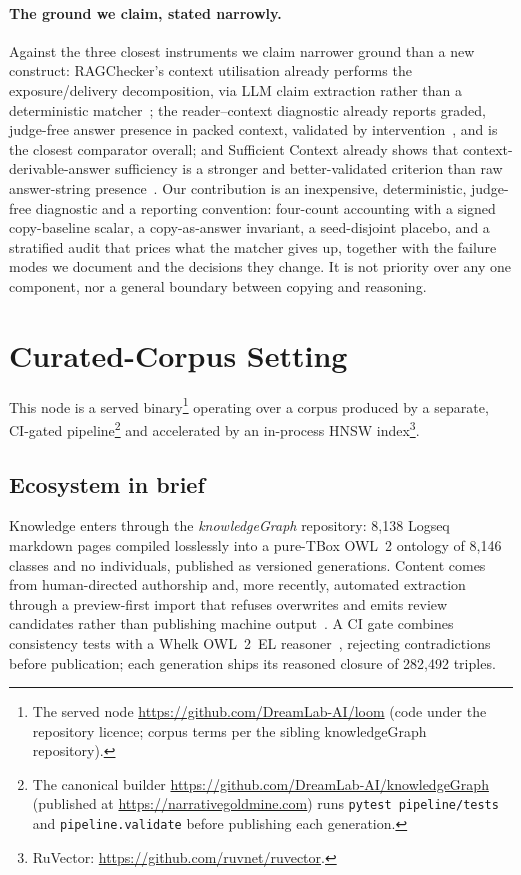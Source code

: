 \documentclass[10pt,twocolumn]{article}
\begin{document}
\paragraph{The ground we claim, stated narrowly.}
Against the three closest instruments we claim narrower ground than a new construct: RAGChecker's context utilisation already performs the exposure/delivery decomposition, via LLM claim extraction rather than a deterministic matcher~\cite{ragchecker2024}; the reader--context diagnostic already reports graded, judge-free answer presence in packed context, validated by intervention~\cite{readercontext2026}, and is the closest comparator overall; and Sufficient Context already shows that context-derivable-answer sufficiency is a stronger and better-validated criterion than raw answer-string presence~\cite{sufficientcontext2025}. Our contribution is an inexpensive, deterministic, judge-free diagnostic and a reporting convention: four-count accounting with a signed copy-baseline scalar, a copy-as-answer invariant, a seed-disjoint placebo, and a stratified audit that prices what the matcher gives up, together with the failure modes we document and the decisions they change. It is not priority over any one component, nor a general boundary between copying and reasoning.

\section{Curated-Corpus Setting}\label{sec:setting}
This node is a served binary\footnote{The served node \url{https://github.com/DreamLab-AI/loom} (code under the repository licence; corpus terms per the sibling knowledgeGraph repository).} operating over a corpus produced by a separate, CI-gated pipeline\footnote{The canonical builder \url{https://github.com/DreamLab-AI/knowledgeGraph} (published at \url{https://narrativegoldmine.com}) runs \texttt{pytest pipeline/tests} and \texttt{pipeline.validate} before publishing each generation.} and accelerated by an in-process HNSW index\footnote{RuVector: \url{https://github.com/ruvnet/ruvector}.}.

\subsection{Ecosystem in brief}\label{sec:ecosystem}
Knowledge enters through the \emph{knowledgeGraph} repository: 8{,}138 Logseq markdown pages compiled losslessly into a pure-TBox OWL~2 ontology of 8{,}146 classes and no individuals, published as versioned generations. Content comes from human-directed authorship and, more recently, automated extraction through a preview-first import that refuses overwrites and emits review candidates rather than publishing machine output~\cite{ontocast}. A CI gate combines consistency tests with a Whelk OWL~2~EL reasoner~\cite{whelk}, rejecting contradictions before publication; each generation ships its reasoned closure of 282{,}492 triples.
\end{document}
